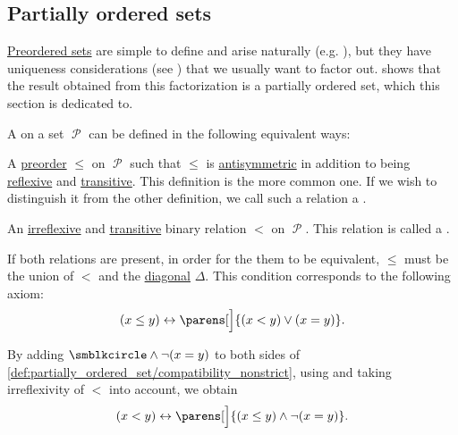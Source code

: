 \subsection{Partially ordered sets}\label{subsec:partially_ordered_sets}

\hyperref[def:preordered_set]{Preordered sets} are simple to define and arise naturally (e.g. ), but they have uniqueness considerations (see ) that we usually want to factor out.  shows that the result obtained from this factorization is a partially ordered set, which this section is dedicated to.

\begin{definition}\label{def:partially_ordered_set}
  A  on a set \( \mscrP \) can be defined in the following equivalent ways:
  \begin{thmenum}[series=def:partially_ordered_set]
     A \hyperref[def:preordered_set]{preorder} \( \leq \) on \( \mscrP \) such that \( \leq \) is \hyperref[def:binary_relation/antisymmetric]{antisymmetric} in addition to being \hyperref[def:binary_relation/reflexive]{reflexive} and \hyperref[def:binary_relation/transitive]{transitive}. This definition is the more common one. If we wish to distinguish it from the other definition, we call such a relation a .

     An \hyperref[def:binary_relation/irreflexive]{irreflexive} and \hyperref[def:binary_relation/transitive]{transitive} binary relation \( < \) on \( \mscrP \). This relation is called a .
  \end{thmenum}

  If both relations are present, in order for the them to be equivalent, \( \leq \) must be the union of \( < \) and the \hyperref[def:binary_relation/diagonal]{diagonal} \( \Delta \). This condition corresponds to the following axiom:
  \begin{equation}\label{def:partially_ordered_set/compatibility_nonstrict}
    (x \leq y) \leftrightarrow \parens[\Big]{(x < y) \vee (x = y)}.
  \end{equation}

  By adding \( \placeholder \wedge \neg (x = y) \) to both sides of \eqref{def:partially_ordered_set/compatibility_nonstrict}, using  and taking irreflexivity of \( < \) into account, we obtain
  \begin{equation}\label{def:partially_ordered_set/compatibility_strict}
    (x < y) \leftrightarrow \parens[\Big]{(x \leq y) \wedge \neg (x = y)}.
  \end{equation}


\end{definition}
